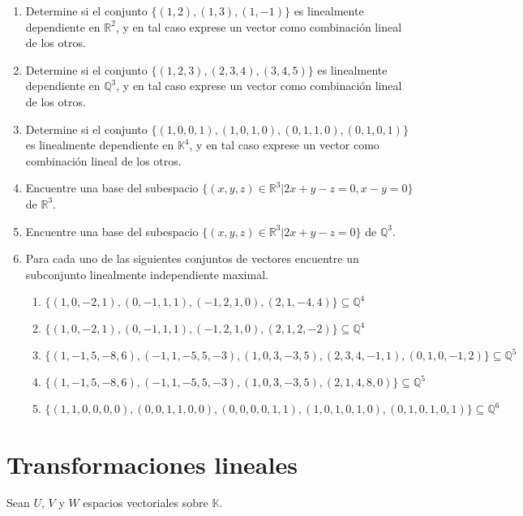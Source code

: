 \begin{enumerate}
  \item Determine si el conjunto $\{(1,2), (1,3), (1,-1)\}$ es linealmente dependiente en $\mathbb{R}^2$, y en tal caso exprese un vector como combinación lineal de los otros.
  \item Determine si el conjunto $\{(1,2,3), (2,3,4), (3,4,5)\}$ es linealmente dependiente en $\mathbb{Q}^3$, y en tal caso exprese un vector como combinación lineal de los otros.
  \item Determine si el conjunto $\{(1,0,0,1), (1,0,1,0), (0,1,1,0), (0,1,0,1)\}$ es linealmente dependiente en $\mathbb{K}^4$, y en tal caso exprese un vector como combinación lineal de los otros.
  \item Encuentre una base del subespacio $\{(x,y,z)\in\mathbb{R}^3|2x+y-z=0,x-y=0\}$ de $\mathbb{R}^3$.
  \item Encuentre una base del subespacio $\{(x,y,z)\in\mathbb{R}^3|2x+y-z=0\}$ de $\mathbb{Q}^3$.
  \item Para cada uno de las siguientes conjuntos de vectores encuentre un subconjunto linealmente independiente maximal.
  \begin{enumerate}
  \item $\big\{(1,0,-2,1),(0,-1,1,1),(-1,2,1,0),(2,1,-4,4)\big\}\subseteq\mathbb{Q}^4$
  \item $\big\{(1,0,-2,1),(0,-1,1,1),(-1,2,1,0),(2,1,2,-2)\big\}\subseteq\mathbb{Q}^4$
  \item $\big\{(1,-1,5,-8,6),(-1,1,-5,5,-3),(1,0,3,-3,5),(2,3,4,-1,1),(0,1,0,-1,2)\big\}\subseteq\mathbb{Q}^5$
  \item $\big\{(1,-1,5,-8,6),(-1,1,-5,5,-3),(1,0,3,-3,5),(2,1,4,8,0)\big\}\subseteq\mathbb{Q}^5$
  \item $\big\{(1,1,0,0,0,0),(0,0,1,1,0,0),(0,0,0,0,1,1),(1,0,1,0,1,0),(0,1,0,1,0,1)\big\}\subseteq\mathbb{Q}^6$
  \end{enumerate}
\end{enumerate}

\section{Transformaciones lineales}

Sean $U$, $V$ y $W$ espacios vectoriales sobre $\mathbb{K}$.

